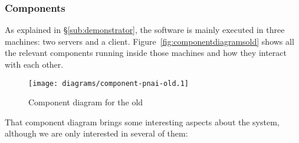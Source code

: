 \subsubsection{Components} %
\label{ssub:componentsold}

As explained in \S\vref{sub:demonstrator}, the software is mainly executed in three machines: two servers and a client.
Figure~\vref{fig:componentdiagramsold} shows all the relevant components running inside those machines and how they interact with each other.

\begin{figure}[htbp]
  \centering
    \texttt{[image: diagrams/component-pnai-old.1]}
  \caption{Component diagram for the old }
  \label{fig:componentdiagramsold}
\end{figure}

That component diagram brings some interesting aspects about the system, although we are only interested in several of them:

